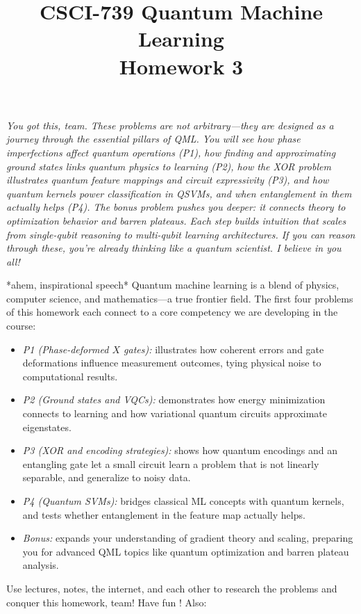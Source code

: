 \documentclass[11pt]{article}
\title{CSCI-739 Quantum Machine Learning \\[4pt] \large Homework 3}
\date{}
\begin{document}
\maketitle

\begin{center}
\textit{You got this, team. These problems are not arbitrary—they are designed as a journey through the essential pillars of QML. You will see how phase imperfections affect quantum operations (P1), how finding and approximating ground states links quantum physics to learning (P2), how the XOR problem illustrates quantum feature mappings and circuit expressivity (P3), and how quantum kernels power classification in QSVMs, and when entanglement in them actually helps (P4). The bonus problem pushes you deeper: it connects theory to optimization behavior and barren plateaus. Each step builds intuition that scales from single-qubit reasoning to multi-qubit learning architectures. If you can reason through these, you’re already thinking like a quantum scientist. I believe in you all! \smiley{}}
\end{center}

\vspace{1em}

\noindent
*ahem, inspirational speech* \newline
Quantum machine learning is a blend of physics, computer science, and mathematics—a true frontier field. The first four problems of this homework each connect to a core competency we are developing in the course:
\begin{itemize}
  \item \emph{P1 (Phase-deformed $X$ gates):} illustrates how coherent errors and gate deformations influence measurement outcomes, tying physical noise to computational results.
  \item \emph{P2 (Ground states and VQCs):} demonstrates how energy minimization connects to learning and how variational quantum circuits approximate eigenstates.
  \item \emph{P3 (XOR and encoding strategies):} shows how quantum encodings and an entangling gate let a small circuit learn a problem that is not linearly separable, and generalize to noisy data.
  \item \emph{P4 (Quantum SVMs):} bridges classical ML concepts with quantum kernels, and tests whether entanglement in the feature map actually helps.
  \item \emph{Bonus:} expands your understanding of gradient theory and scaling, preparing you for advanced QML topics like quantum optimization and barren plateau analysis.
\end{itemize}
Use lectures, notes, the internet, and each other to research the problems and conquer this homework, team! Have fun \smiley{}! Also:
\end{document}
